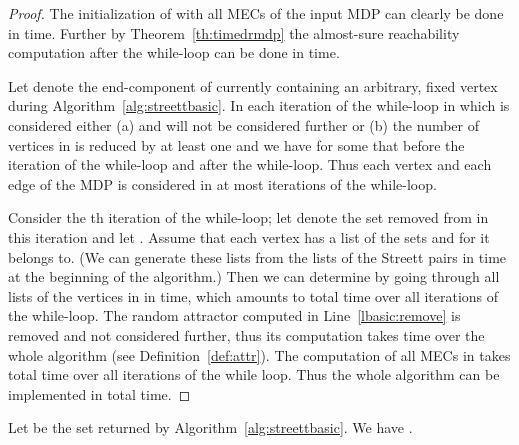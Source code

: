 \documentclass[11pt,letterpaper]{article}
\begin{document}
\begin{proof}
	The initialization of  with all MECs of the input
	MDP  can clearly be done in  time. Further by 
	Theorem~\ref{th:timedrmdp} the almost-sure reachability computation
	after the while-loop can be done in  time. 
	
	Let  denote the end-component of  currently containing 
	an arbitrary, fixed vertex  during Algorithm~\ref{alg:streettbasic}. 
	In each iteration
	of the while-loop in which  is considered either (a) 
	and  will not be considered further or (b) the number of vertices
	in  is reduced by at least one and we have for some  that
	 before the iteration of the while-loop and
	 after the while-loop. Thus each vertex and 
	each edge of the MDP  is considered in at most  iterations
	of the while-loop.
	
	Consider the th iteration of the while-loop; let  denote the set 
	removed from  in this iteration and let . 
	Assume that each vertex has a list of the sets  and  for 
	 it belongs to.
	(We can generate these lists from the lists of the Streett pairs in 
	time at the beginning of the algorithm.)
	Then we can determine  by going through all lists of the vertices 
	in  in  time, which amounts to 
	 total time over all iterations of the while-loop.
	The random attractor computed in Line~\ref{lbasic:remove} is removed and 
	not considered further, thus its computation takes  time over the whole 
	algorithm (see Definition~\ref{def:attr}). The computation
	of all MECs in  takes total time 
	over all iterations of the while loop. Thus the whole algorithm can be 
	implemented in  total time.
\end{proof}

\begin{proposition}
	Let  be the set returned by Algorithm~\ref{alg:streettbasic}.
	We have .
\end{proposition}
\end{document}
